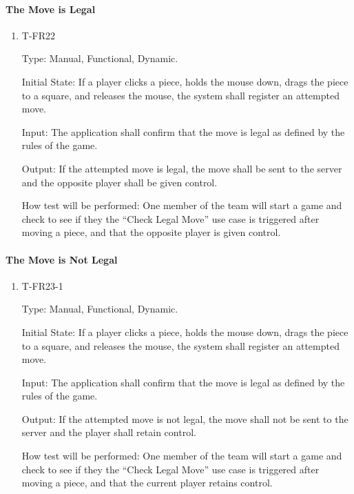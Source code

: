 \documentclass[12pt, titlepage]{article}
\begin{document}
    \paragraph{The Move is Legal}

            \begin{enumerate}

            \item{T-FR22\\}

                Type: Manual, Functional, Dynamic.
                					
                Initial State: If a player clicks a piece, holds the mouse down, drags the piece to a square, and releases the mouse, the system shall register an attempted move.
                					
                Input: The application shall confirm that the move is legal as defined by the rules of the game.
                					
                Output: If the attempted move is legal, the move shall be sent to the server and the opposite player shall be given control.

                How test will be performed: One member of the team will start a game and check to see if they the ``Check Legal Move'' use case is triggered after moving a piece, and that the opposite player is given control.

            \end{enumerate}

    \paragraph{The Move is Not Legal}

        \begin{enumerate}

        \item{T-FR23-1\\}

            Type: Manual, Functional, Dynamic.
            					
            Initial State: If a player clicks a piece, holds the mouse down, drags the piece to a square, and releases the mouse, the system shall register an attempted move.
            					
            Input: The application shall confirm that the move is legal as defined by the rules of the game.
            					
            Output: If the attempted move is not legal, the move shall not be sent to the server and the player shall retain control.

            How test will be performed: One member of the team will start a game and check to see if they the ``Check Legal Move'' use case is triggered after moving a piece, and that the current player retains control.

        \end{enumerate}
\end{document}
